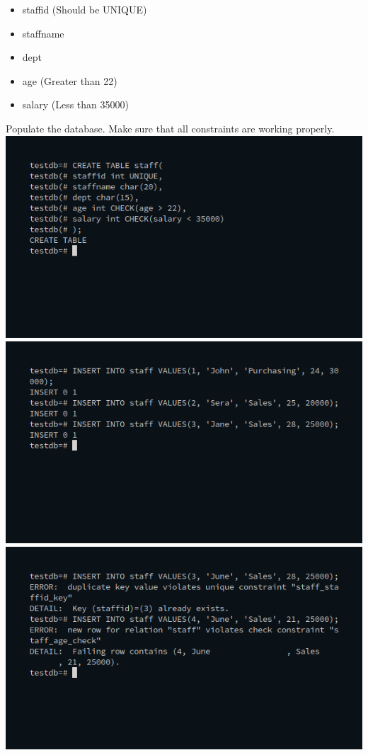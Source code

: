 \documentclass[10pt,a4paper,titlepage]{report}
\begin{document}
{\begin{enumerate}
\begin{enumerate}
		\begin{itemize}
			\item staffid (Should be UNIQUE)
			\item staffname
			\item dept
			\item age (Greater than 22)
			\item salary (Less than 35000)
		\end{itemize}
		Populate the database. Make sure that all constraints are working properly.\newline
		\includegraphics[width=\linewidth]{../Images/Constraints/3.png}\newline
		\includegraphics[width=\linewidth]{../Images/Constraints/4.png}\newline
		\includegraphics[width=\linewidth]{../Images/Constraints/5.png}\newline

\end{enumerate}
\end{enumerate}}
\end{document}
